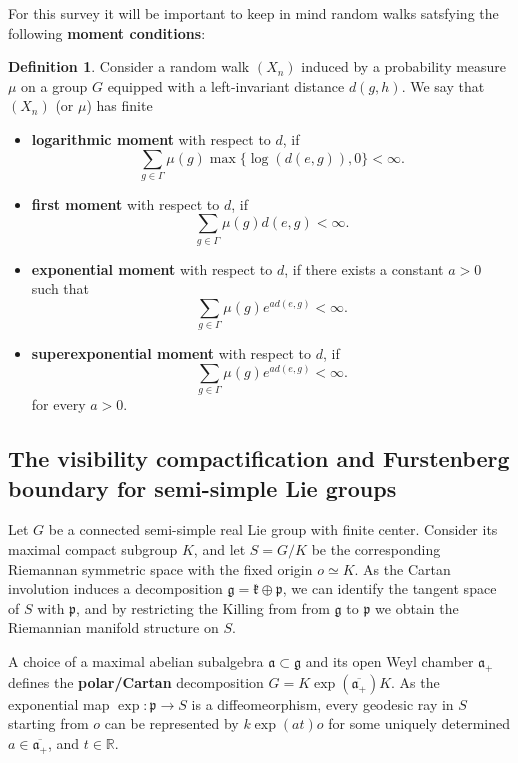 \documentclass[11pt]{amsart}
\theoremstyle{definition}
\newtheorem{definition}{Definition}[section]
\begin{document}
			For this survey it will be important to keep in mind random walks satsfying the following \textbf{moment conditions}:
			\begin{definition}
				Consider a random walk $(X_n)$ induced by a probability measure $\mu$ on a group $G$ equipped with a left-invariant distance $d(g, h)$. We say that $(X_n)$ (or $\mu$) has finite
				\begin{itemize}
					\item \textbf{logarithmic moment} with respect to $d$, if
					\[
					\sum_{g \in \Gamma} \mu(g) \max \{ \log(d(e, g)), 0 \} < \infty.
					\]
					\item \textbf{first moment} with respect to $d$, if
					\[
					\sum_{g \in \Gamma} \mu(g) d(e, g) < \infty.
					\]
					\item \textbf{exponential moment} with respect to $d$, if there exists a constant $a > 0$ such that
					\[
					\sum_{g \in \Gamma} \mu(g) e^{a d(e, g)} < \infty.
					\]
					\item \textbf{superexponential moment} with respect to $d$, if
					\[
					\sum_{g \in \Gamma} \mu(g) e^{a d(e, g)} < \infty.
					\]
					for every $a > 0$.
				\end{itemize}
			\end{definition}
			
		\subsection{The visibility compactification and Furstenberg boundary for semi-simple Lie groups}
		Let $G$ be a connected semi-simple real Lie group with finite center. Consider its maximal compact subgroup $K$, and let $S = G / K$ be the corresponding Riemannan symmetric space with the fixed origin $o \simeq K$. As the Cartan involution induces a decomposition $\mathfrak{g} = \mathfrak{k} \oplus \mathfrak{p}$, we can identify the tangent space of $S$ with $\mathfrak{p}$, and by restricting the Killing from from $\mathfrak{g}$ to $\mathfrak{p}$ we obtain the Riemannian manifold structure on $S$.
		
		A choice of a maximal abelian subalgebra $\mathfrak{a} \subset \mathfrak{g}$ and its open Weyl chamber $\mathfrak{a}_+$ defines the \textbf{polar/Cartan} decomposition $G = K\exp(\overline{\mathfrak{a}_+}) K$. As the exponential map $\exp : \mathfrak{p} \rightarrow S$ is a diffeomeorphism, every geodesic ray in $S$ starting from $o$ can be represented by $k \exp(a t) o$ for some uniquely determined $a \in \overline{\mathfrak{a}_+}$, and $t \in \mathbb{R}$. 
		
\end{document}
